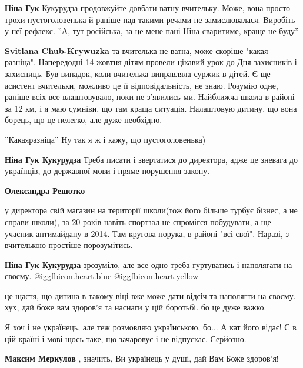 \begin{itemize}
\begin{itemize} %
\textbf{Ніна Гук} Кукурудза продовжуйте довбати ватну вчительку. Може, вона просто трохи пустоголовенька й раніше над такими речами не замислювалася.
Виробіть у неї рефлекс. ''А, тут російська, за це мене пані Ніна сваритиме, краще не буду''

\textbf{Svitlana Chub-Krywuzka} та вчителька не ватна, може скоріше "какая разніца". Напередодні 14 жовтня дітям провели цікавий урок до Дня захисників і захисниць. Був випадок, коли вчителька виправляла суржик в дітей. Є ще асистент вчительки, можливо це її відповідальність, не знаю. Розумію одне, раніше всіх все влаштовувало, поки не з'явились ми. Найближча школа в районі за 12 км, і я маю сумніви, що там краща ситуація. Налаштовую дитину, що вона борець, що це нелегко, але дуже необхідно.

''Какаяразніца''
Ну так я ж і кажу, що пустоголовенька)

\textbf{Ніна Гук Кукурудза} Треба писати і звертатися до директора, адже це зневага до українців, до державної мови і пряме порушення закону.

\textbf{Олександра Решотко} 

у директора свій магазин на території школи(тож його більше турбує бізнес, а не
справи школи), за 20 років навіть спортзал не спромігся побудувати, а ще
учасник антимайдану в 2014. Там кругова порука, в районі "всі свої". Наразі, з
вчителькою простіше порозумітись.

\textbf{Ніна Гук Кукурудза} зрозуміло, але все одно треба гуртуватись і наполягати на своєму. @igg{fbicon.heart.blue}  @igg{fbicon.heart.yellow} 

\end{itemize} %


це щастя, що дитина в такому віці вже може дати відсіч та наполягти на своєму.
хух, дай боже вам здоров'я та наснаги у цій боротьбі. бо це дуже важко.



Я хоч і не українець, але теж розмовляю українською, бо... А кат його відає! Є
в цій країні і мові щось таке, що зачаровує і не відпускає. Серйозно.

\begin{itemize} %
\textbf{Максим Меркулов} , значить, Ви українець у душі, дай Вам Боже здоров'я!


\end{itemize}
\end{itemize}
